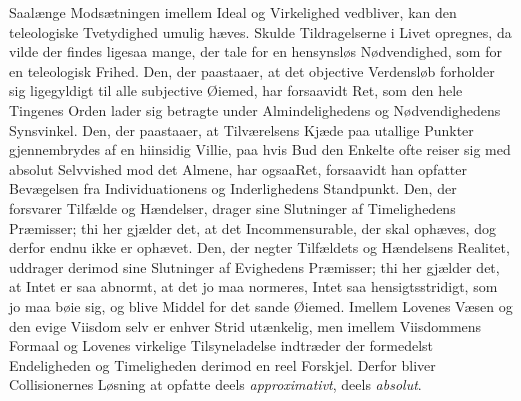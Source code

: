 \documentclass[12pt]{book}
\newcommand{\opage}[1]{\marginnote{\footnotesize\textit{[#1]}}}
\begin{document}
Saalænge Modsætningen imellem Ideal og Virkelighed vedbliver, kan den teleologiske
Tvetydighed umulig hæves. Skulde Tildragelserne i Livet opregnes, da vilde der findes
ligesaa mange, der tale for en hensynsløs Nødvendighed, som for en teleologisk Frihed.
\opage{245} Den, der paastaaer, at det objective Verdensløb forholder sig ligegyldigt til alle
subjective Øiemed, har forsaavidt Ret, som den hele Tingenes Orden lader sig betragte
under Almindelighedens og Nødvendighedens Synsvinkel. Den, der paastaaer, at
Tilværelsens Kjæde paa utallige Punkter gjennembrydes af en hiinsidig Villie, paa hvis
Bud den Enkelte ofte reiser sig med absolut Selvvished mod det Almene, har ogsaaRet,
forsaavidt han opfatter Bevægelsen fra Individuationens og Inderlighedens Standpunkt.
Den, der forsvarer Tilfælde og Hændelser, drager sine Slutninger af Timelighedens
Præmisser; thi her gjælder det, at det Incommensurable, der skal ophæves, dog derfor
endnu ikke er ophævet. Den, der negter Tilfældets og Hændelsens Realitet, uddrager
derimod sine Slutninger af Evighedens Præmisser; thi her gjælder det, at Intet er saa
abnormt, at det jo maa normeres, Intet saa hensigtsstridigt, som jo maa bøie sig, og
blive Middel for det sande Øiemed. Imellem Lovenes Væsen og den evige Viisdom selv er
enhver Strid utænkelig, men imellem Viisdommens Formaal og Lovenes virkelige
Tilsyneladelse indtræder der formedelst Endeligheden og Timeligheden derimod en reel
Forskjel. Derfor bliver Collisionernes Løsning at opfatte deels \emph{approximativt},
deels \emph{absolut}.
\end{document}
